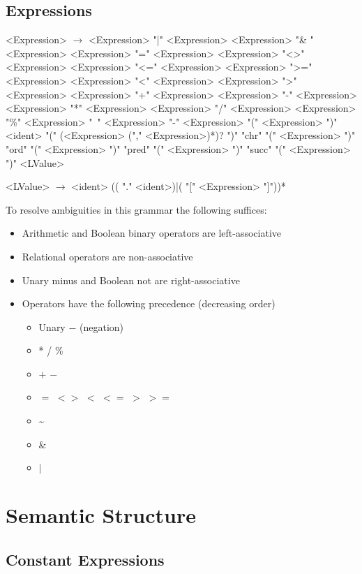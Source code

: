 \documentclass{book}
\begin{document}
\section{Expressions}
\begin{grammar}
<Expression> $\rightarrow$ <Expression> "|" <Expression>
\alt <Expression> "\& " <Expression>
\alt <Expression> "=" <Expression>
\alt <Expression> "<>" <Expression>
\alt <Expression> "<=" <Expression>
\alt <Expression> ">=" <Expression>
\alt <Expression> "<" <Expression>
\alt <Expression> ">" <Expression>
\alt <Expression> "+" <Expression>
\alt <Expression> "-" <Expression>
\alt <Expression> "*" <Expression>
\alt <Expression> "/" <Expression>
\alt <Expression> "\%" <Expression>
\alt "~" <Expression>
\alt "-" <Expression>
\alt "(" <Expression> ")"
\alt <ident> "(" (<Expression> ("," <Expression>)*)? ")"
\alt "chr" "(" <Expression> ")"
\alt "ord" "(" <Expression> ")"
\alt "pred" "(" <Expression> ")"
\alt "succ" "(" <Expression> ")"
\alt <LValue>

<LValue> $\rightarrow$ <ident> (( "." <ident>)|( "[" <Expression> "]"))*

\end{grammar}
To resolve ambiguities in this grammar the following suffices:
\begin{itemize}
\item Arithmetic and Boolean binary operators are left-associative
\item Relational operators are non-associative
\item Unary minus and Boolean not are right-associative
\item Operators have the following precedence (decreasing order)
\begin{itemize}
\item Unary $-$ (negation)
\item * / \%
\item $+$ $-$
\item $=$ $<>$ $<$ $<=$ $>$ $>=$
\item \textasciitilde
\item \&
\item $|$
\end{itemize}
\end{itemize}
\chapter{Semantic Structure}
\section{Constant Expressions}
\end{document}
